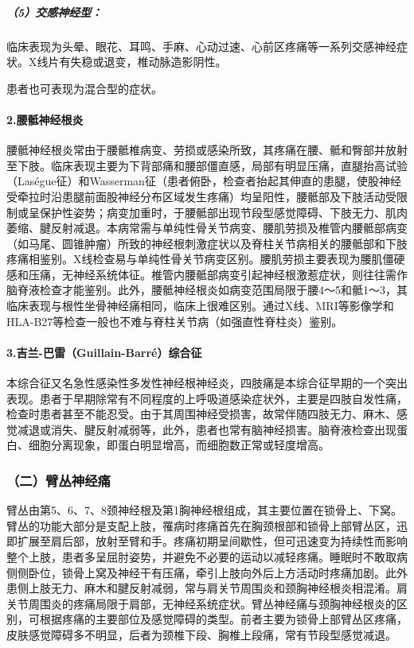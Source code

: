 \subparagraph{（5）交感神经型：}

临床表现为头晕、眼花、耳鸣、手麻、心动过速、心前区疼痛等一系列交感神经症状。X线片有失稳或退变，椎动脉造影阴性。

患者也可表现为混合型的症状。

\paragraph{2.腰骶神经根炎}

腰骶神经根炎常由于腰骶椎病变、劳损或感染所致，其疼痛在腰、骶和臀部并放射至下肢。临床表现主要为下背部痛和腰部僵直感，局部有明显压痛，直腿抬高试验（Laségue征）和Wasserman征（患者俯卧，检查者抬起其伸直的患腿，使股神经受牵拉时沿患腿前面股神经分布区域发生疼痛）均呈阳性，腰骶部及下肢活动受限制或呈保护性姿势；病变加重时，于腰骶部出现节段型感觉障碍、下肢无力、肌肉萎缩、腱反射减退。本病常需与单纯性骨关节病变、腰肌劳损及椎管内腰骶部病变（如马尾、圆锥肿瘤）所致的神经根刺激症状以及脊柱关节病相关的腰骶部和下肢疼痛相鉴别。X线检查易与单纯性骨关节病变区别。腰肌劳损主要表现为腰肌僵硬感和压痛，无神经系统体征。椎管内腰骶部病变引起神经根激惹症状，则往往需作脑脊液检查才能鉴别。此外，腰骶神经根炎如病变范围局限于腰4～5和骶1～3，其临床表现与根性坐骨神经痛相同，临床上很难区别。通过X线、MRI等影像学和HLA-B27等检查一般也不难与脊柱关节病（如强直性脊柱炎）鉴别。

\paragraph{3.吉兰-巴雷（Guillain-Barré）综合征}

本综合征又名急性感染性多发性神经根神经炎，四肢痛是本综合征早期的一个突出表现。患者于早期除常有不同程度的上呼吸道感染症状外，主要是四肢自发性痛，检查时患者甚至不能忍受。由于其周围神经受损害，故常伴随四肢无力、麻木、感觉减退或消失、腱反射减弱等，此外，患者也常有脑神经损害。脑脊液检查出现蛋白、细胞分离现象，即蛋白明显增高，而细胞数正常或轻度增高。

\subsubsection{（二）臂丛神经痛}

臂丛由第5、6、7、8颈神经根及第1胸神经根组成，其主要位置在锁骨上、下窝。臂丛的功能大部分是支配上肢，罹病时疼痛首先在胸颈根部和锁骨上部臂丛区，迅即扩展至肩后部，放射至臂和手。疼痛初期呈间歇性，但可迅速变为持续性而影响整个上肢，患者多呈屈肘姿势，并避免不必要的运动以减轻疼痛。睡眠时不敢取病侧侧卧位，锁骨上窝及神经干有压痛，牵引上肢向外后上方活动时疼痛加剧。此外患侧上肢无力、麻木和腱反射减弱，常与肩关节周围炎和颈胸神经根炎相混淆。肩关节周围炎的疼痛局限于肩部，无神经系统症状。臂丛神经痛与颈胸神经根炎的区别，可根据疼痛的主要部位及感觉障碍的类型。前者主要为锁骨上部臂丛区疼痛，皮肤感觉障碍多不明显，后者为颈椎下段、胸椎上段痛，常有节段型感觉减退。

